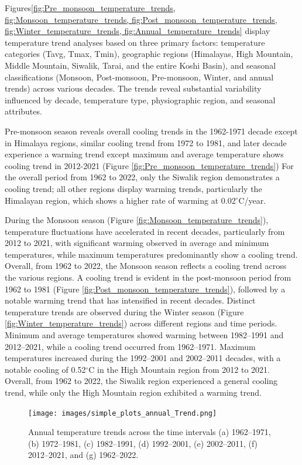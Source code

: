 Figures\ref{fig:Pre_monsoon_temperature_trends, fig:Monsoon_temperature_trends, fig:Post_monsoon_temperature_trends, fig:Winter_temperature_trends, fig:Annual_temperature_trends}  display temperature trend analyses based on three primary factors: temperature categories (Tavg, Tmax, Tmin), geographic regions (Himalayas, High Mountain, Middle Mountain, Siwalik, Tarai, and the entire Koshi Basin), and seasonal classifications (Monsoon, Post-monsoon, Pre-monsoon, Winter, and annual trends) across various decades. The trends reveal substantial variability influenced by decade, temperature type, physiographic region, and seasonal attributes.

Pre-monsoon season reveals overall cooling trends in the 1962-1971 decade except in Himalaya regions, similar cooling trend from 1972 to 1981, and later decade experience a warming trend except maximum and average temperature shows cooling trend in 2012-2021 (Figure \ref{fig:Pre_monsoon_temperature_trends}) For the overall period from 1962 to 2022, only the Siwalik region demonstrates a cooling trend; all other regions display warming trends, particularly the Himalayan region, which shows a higher rate of warming at 0.02$^\circ$C/year.  

During the Monsoon season (Figure \ref{fig:Monsoon_temperature_trends}), temperature fluctuations have accelerated in recent decades, particularly from 2012 to 2021, with significant warming observed in average and minimum temperatures, while maximum temperatures predominantly show a cooling trend. Overall, from 1962 to 2022, the Monsoon season reflects a cooling trend across the various regions.
A cooling trend is evident in the post-monsoon period from 1962 to 1981 (Figure \ref{fig:Post_monsoon_temperature_trends}), followed by a notable warming trend that has intensified in recent decades.
Distinct temperature trends are observed during the Winter season (Figure \ref{fig:Winter_temperature_trends}) across different regions and time periods. Minimum and average temperatures showed warming between 1982–1991 and 2012–2021, while a cooling trend occurred from 1962–1971. Maximum temperatures increased during the 1992–2001 and 2002–2011 decades, with a notable cooling of 0.52$^\circ$C in the High Mountain region from 2012 to 2021. Overall, from 1962 to 2022, the Siwalik region experienced a general cooling trend, while only the High Mountain region exhibited a warming trend.

\begin{figure}[H] 
  \centering
  \texttt{[image: images/simple\_plots\_annual\_Trend.png]}  
  \caption{Annual temperature trends across the time intervals (a) 1962–1971, (b) 1972–1981, (c) 1982–1991, (d) 1992–2001, (e) 2002–2011, (f) 2012–2021, and (g) 1962–2022.} 
  \label{fig:Annual_temperature_trends}  
\end{figure}

